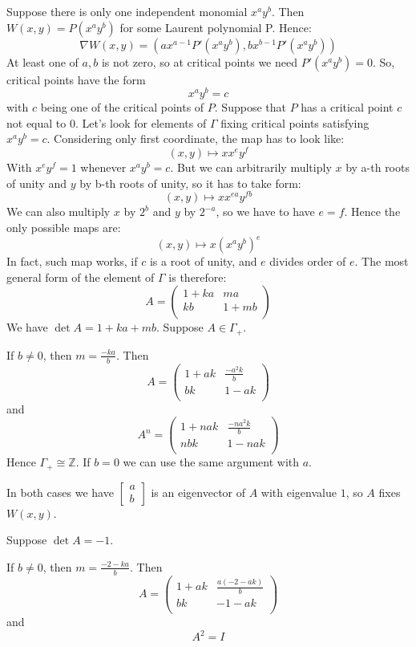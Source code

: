 \documentclass[a4paper]{article}
\begin{document}
Suppose there is only one independent monomial $x^a y^b$. Then
$W(x, y) = P(x^a y^b)$ for some Laurent polynomial P.
Hence:
$$\nabla W(x,y) = (a x^{a-1} P'(x^a y^b), b x^{b-1} P'(x^a y^b))$$
At least one of $a, b$ is not zero, so at critical points we need $P'(x^a y^b) = 0$.
So, critical points have the form $$x^a y^b = c$$ with $c$ being one of the critical points of $P$.
Suppose that $P$ has a critical point $c$ not equal to $0$.
Let's look for elements of $\Gamma$ fixing critical points satisfying $x^a y^b =c$. Considering only first coordinate, the map has to look like:
$$(x,y) \mapsto x x^e y^f$$
With $x^e y^f=1$ whenever $x^a y^b = c$.
But we can arbitrarily multiply $x$ by a-th roots of unity and $y$ by b-th roots of unity, so it has to take form:
$$(x,y) \mapsto x x^{e a} y^{f b}$$
We can also multiply $x$ by $2^b$ and $y$ by $2^{-a}$, so we have to have $e=f$. Hence the only possible maps are:
$$(x,y) \mapsto x (x^{a} y^{b})^e$$
In fact, such map works, if $c$ is a root of unity, and $e$ divides order of $e$.
The most general form of the element of $\Gamma$ is therefore:
$$A = \begin{pmatrix}
	1+ k a & m a \\ 
	k b & 1+m b \\
\end{pmatrix}$$
We have $\det A = 1 + k a + m b$.
Suppose $A \in \Gamma_+$.

If $b \neq 0$, then $m = \frac{-k a}{b}$.
Then 
$$A = \begin{pmatrix}
1 + a k & \frac{- a^2 k}{b} \\ 
b k & 1 - a k \\
\end{pmatrix} $$
and 
$$A^n = \begin{pmatrix}
1 + n a k & \frac{- n a^2 k}{b} \\ 
n b k & 1 - n a k \\
\end{pmatrix} $$
Hence $\Gamma_+ \cong \mathbb{Z}$.
If $b = 0$ we can use the same argument with $a$.

In both cases we have $ \begin{bmatrix}
a\\ 
b 
\end{bmatrix}$ is an eigenvector of $A$ with eigenvalue $1$, so $A$ fixes $W(x,y)$.

Suppose $\det A  = -1$.

If $b \neq 0$, then $m = \frac{-2-k a}{b}$.
Then 
$$A = \begin{pmatrix}
1 + a k & \frac{a(-2-a k)}{b} \\ 
b k & -1 - a k \\
\end{pmatrix} $$
and 
$$A^2 = I $$
\end{document}
